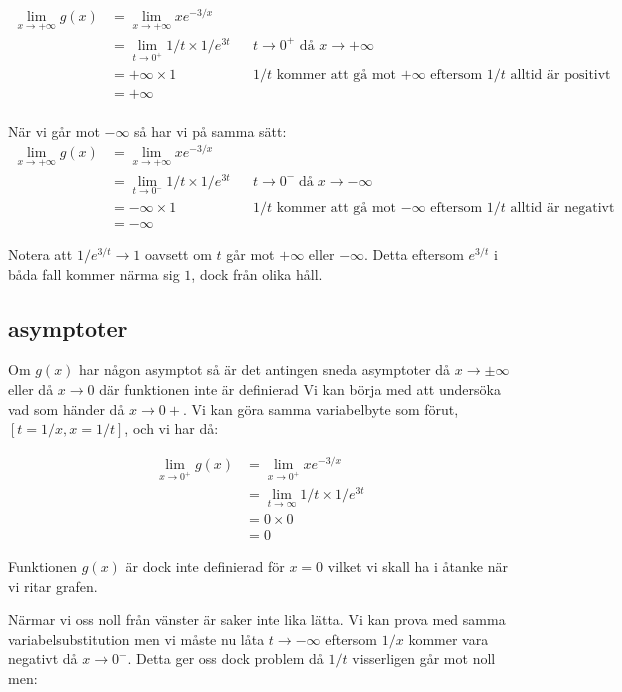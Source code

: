 \documentclass[a4paper, 11pt]{article}
\begin{document}
\begin{align*}
  \lim\limits_{x \to +\infty} g(x) &=  \lim\limits_{x \to +\infty} x e^{-3/x}\\
  &= \lim\limits_{t \to 0^+}1/t \times 1/e^{3t} &&t \rightarrow 0^+ \text{\ då\ }  x \rightarrow +\infty\\
  &= +\infty \times 1 &&\text{$1/t$ kommer att gå mot $+\infty$ eftersom  $1/t$ alltid är positivt}\\
  &= +\infty \\
\end{align*}

När vi går mot $-\infty$ så har vi på samma sätt:
\begin{align*}
  \lim\limits_{x \to +\infty} g(x) &=  \lim\limits_{x \to +\infty} x e^{-3/x}\\
  &=  \lim\limits_{t \to 0^-}1/t \times 1/e^{3t} &&t \rightarrow 0^- \; \text{då}\;  x \rightarrow -\infty\\
  & = -\infty \times 1 &&\text{$1/t$ kommer att gå mot $-\infty$ eftersom  $1/t$ alltid är negativt}\\
  & = -\infty 
\end{align*}

Notera att $1/e^{3/t}\rightarrow 1$ oavsett om $t$ går mot $+\infty$ eller
$-\infty$. Detta eftersom $e^{3/t}$ i båda fall kommer närma sig $1$,
dock från olika håll.

\subsection*{asymptoter}

Om $g(x)$ har någon asymptot så är det antingen sneda asymptoter då $x
\rightarrow \pm\infty$ eller då $x \rightarrow 0$ där funktionen inte är
definierad Vi kan börja med att undersöka vad som händer då $x
\rightarrow 0+$. Vi kan göra samma variabelbyte som förut, $[ t = 1/x, x = 1/t
]$, och vi har då:


\begin{align*}
  \lim\limits_{x \to 0^+} g(x) &= \lim\limits_{x \to 0^+} x e^{-3/x} \\
  &= \lim\limits_{t \to \infty} 1/t \times 1/e^{3t} \\
  &= 0 \times 0 \\
  &= 0
\end{align*}

Funktionen $g(x)$ är dock inte definierad för $x = 0$ vilket vi skall
ha i åtanke när vi ritar grafen.

Närmar vi oss noll från vänster är saker inte lika lätta. Vi kan prova
med samma variabelsubstitution men vi måste nu låta $t \rightarrow
-\infty$ eftersom $1/x$ kommer vara negativt då $x \rightarrow
0^-$. Detta ger oss dock problem då $1/t$ visserligen går mot noll men:
\end{document}
